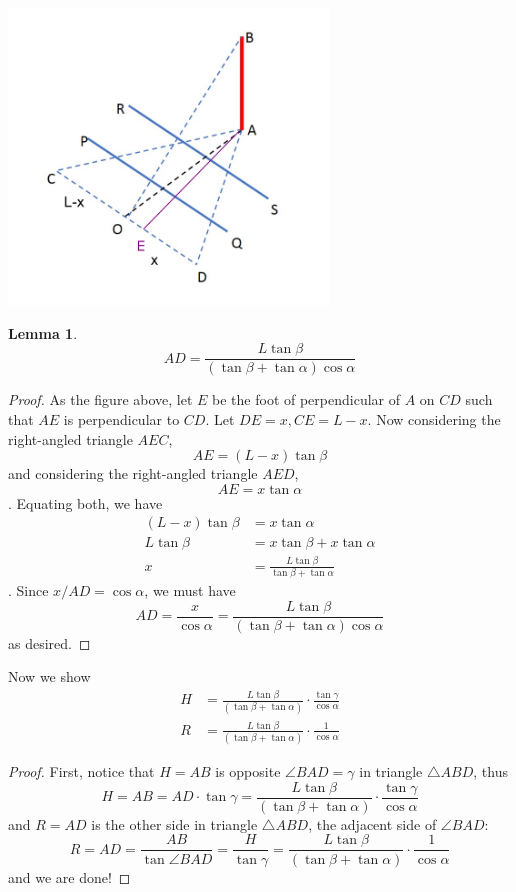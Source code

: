 \documentclass{article}
\newtheorem*{lemma}{Lemma}
\begin{document}
\begin{center}
\includegraphics[width=8.5cm]{q9.png}
\end{center}
\begin{lemma}
\[AD=\frac{L\tan\beta}{(\tan\beta+\tan\alpha)\cos\alpha}\]
\end{lemma}
\begin{proof}
  As the figure above, let $E$ be the foot of perpendicular of $A$ on $CD$ such
  that $AE$ is perpendicular to $CD$. Let $DE=x,CE=L-x$. Now considering the
  right-angled triangle $AEC$,
  \[ AE = (L-x)\tan\beta\]
  and considering the right-angled triangle $AED$,
  \[ AE = x\tan\alpha\].
  Equating both, we have
  \begin{align*}
    (L-x)\tan\beta &= x\tan\alpha\\
    L\tan\beta &= x\tan\beta+x\tan\alpha\\
    x &= \frac{L\tan\beta}{\tan\beta+\tan\alpha}
  \end{align*}. Since $x/AD=\cos\alpha$, we must have
  \[ AD = \frac{x}{\cos\alpha} = \frac{L\tan\beta}{(\tan\beta+\tan\alpha)\cos\alpha}\]
  as desired.
\end{proof}
Now we show
\begin{align*}
  H &= \frac{L\tan\beta}{(\tan\beta+\tan\alpha)}\cdot\frac{\tan\gamma}{\cos\alpha}\\
  R &= \frac{L\tan\beta}{(\tan\beta+\tan\alpha)}\cdot\frac{1}{\cos\alpha}
\end{align*}
\begin{proof}
  First, notice that $H=AB$ is opposite $\angle BAD=\gamma$ in triangle
  $\triangle ABD$, thus
  \[H=AB=AD\cdot\tan\gamma= \frac{L\tan\beta}{(\tan\beta+\tan\alpha)}\cdot\frac{\tan\gamma}{\cos\alpha}\]
  and $R=AD$ is the other side in triangle $\triangle ABD$, the adjacent side of $\angle BAD$:
  \[ R=AD=\frac{AB}{\tan\angle BAD} = \frac{H}{\tan\gamma} = \frac{L\tan\beta}{(\tan\beta+\tan\alpha)}\cdot\frac{1}{\cos\alpha}\]
  and we are done!
\end{proof}
\pagebreak
\end{document}

